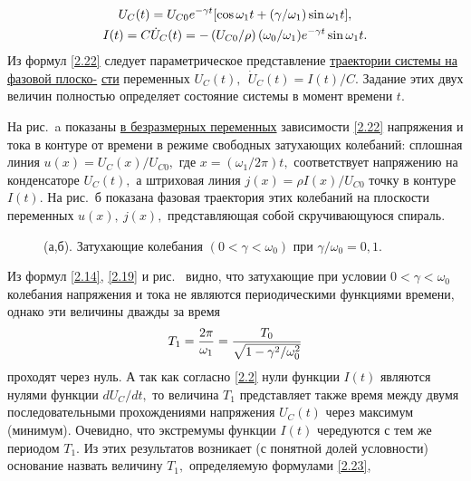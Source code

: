 \begin{equation}
	\eqmark{2.22}
		\begin{gathered}[c]
			U_C(t)=U_{C0}e^{-\gamma t}[\cos\omega_1t+(\gamma/\omega_1)\sin\omega_1t], \\
			I(t)=C\dot{U}_C(t)
=-\left(U_{C0}/\rho\right)(\omega_0/\omega_1)e^{-\gamma t}\sin\omega_1t.
		\end{gathered}
\end{equation}
Из формул \eqref{2.22} следует параметрическое представление \underline{траектории системы на фазовой плоско-} \underline{сти} переменных $U_C(t),~~\dot{U}_C(t)=I(t)/C.$ Задание этих двух величин полностью определяет состояние системы в момент времени $t.$

На рис.~a показаны \underline{в безразмерных переменных} зависимости \eqref{2.22} напряжения и тока в контуре от времени в режиме свободных затухающих колебаний: сплошная линия $u(x)=U_C(x)/U_{C0},$ где $x=(\omega_1/2\pi)t,$ соответствует напряжению на конденсаторе $U_C(t),$ а штриховая линия $j(x)=\rho I(x)/U_{C0}$ \important{--} точку в контуре $I(t).$ На рис.~б показана фазовая траектория этих колебаний на плоскости переменных   $u(x),~j(x),$ представляющая собой скручивающуюся спираль.

\begin{figure}[h]
	\begin{minipage}[h]{0.5\linewidth}
	\end{minipage}
	\hfill
	\begin{minipage}[h]{0.5\linewidth}
	\end{minipage}
	\caption{(а,б). Затухающие колебания $(0<\gamma<\omega_0)$ при $\gamma/\omega_0=0,1$.}
\end{figure}

Из формул \eqref{2.14}, \eqref{2.19} и рис.~ видно, что затухающие при условии $0<\gamma<\omega_0$ колебания напряжения и тока не являются периодическими функциями времени, однако эти величины дважды за время
\begin{equation}\eqmark{2.23}
T_1=\dfrac{2\pi}{\omega_1}=\dfrac{T_0}{\sqrt{1-\gamma^2/\omega_0^2}}
\end{equation}
проходят через нуль. А так как согласно \eqref{2.2} нули функции $I(t)$ являются нулями функции $dU_C/dt,$ то величина $T_1$ представляет также время между двумя последовательными прохождениями напряжения $U_C(t)$ через максимум (минимум). Очевидно, что экстремумы функции $I(t)$ чередуются с тем же периодом $T_1.$ Из этих результатов возникает (с понятной долей условности) основание назвать  величину $T_1,$ определяемую формулами \eqref{2.23}, 


